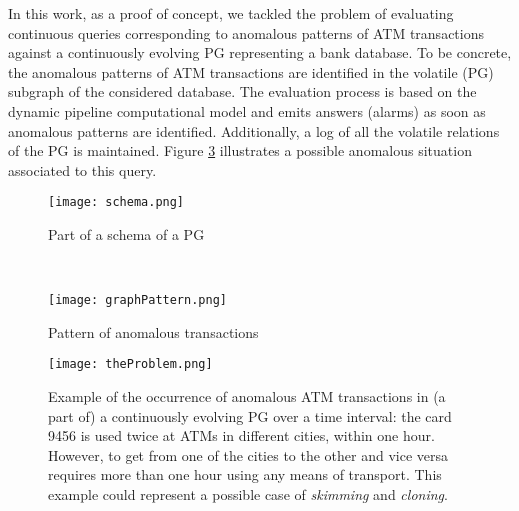 %
In this work, as a proof of concept,  we tackled the problem of evaluating continuous queries corresponding to anomalous patterns of ATM transactions against a continuously evolving PG representing a bank database. To be concrete, the  anomalous patterns of ATM transactions are identified in the volatile (PG) subgraph of the considered database. The evaluation process is based on the dynamic pipeline computational model and  emits  answers (alarms) as soon as anomalous patterns are identified. Additionally, a log of all the volatile relations of the PG is maintained.  Figure \ref{fig:theProblem} illustrates a possible anomalous situation associated to this query.
%
\begin{figure*}[t!]
    \centering
    \begin{subfigure}[b]{0.6\textwidth}
        \centering
        \texttt{[image: schema.png]}
        \caption{Part of a schema of a PG}
         \label{fig:constinuousPGa}
    \end{subfigure}%
     ~ 
    \begin{subfigure}[b]{0.4\textwidth}
        \centering
        \texttt{[image: graphPattern.png]}
        \caption{Pattern of anomalous transactions}
        \label{fig:constinuousPGb}
    \end{subfigure}
    \caption{Part of a PG schema specifying volatile (\textsf{\bf interaction} edges) and stable  (\textsf{\bf issued\_by, owned\_by, interbank} edges) relations in an evolving ATM Network and a continuous query pattern.}
    \label{fig:constinuousPG}
\end{figure*}
%
\begin{figure}[h]
         \centering
         \texttt{[image: theProblem.png]}
         \caption{Example of the occurrence of anomalous ATM transactions in (a part of) a continuously evolving PG over a time interval: the card \textsf{9456} is used twice at ATMs in different cities, within one hour. However, to get from one of the cities to the other and vice versa requires more than one hour using any means of transport. This example could represent a possible case of \emph{skimming} and \emph{cloning}.}
         \label{fig:theProblem}
\end{figure}
%
%

